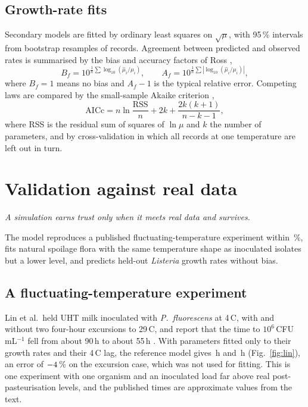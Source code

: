 \documentclass[11pt,a4paper,twoside,openany]{book}
\newcommand{\hook}[1]{{\noindent\fontsize{14}{20}\selectfont\itshape\color{dggrey}#1\par}\vspace{14pt}}
\newcommand{\degC}{\,\textdegree C}
\theoremstyle{plain}\newtheorem{proposition}{Proposition}\newtheorem{corollary}{Corollary}
\theoremstyle{definition}\newtheorem{definition}{Definition}[chapter]
\begin{document}
\section{Growth-rate fits}
Secondary models are fitted by ordinary least squares on $\sqrt{\mu}$, with 95\,\% intervals from bootstrap resamples of records. Agreement between predicted and observed rates is summarised by the bias and accuracy factors of Ross \cite{ross1996},
\begin{equation}\label{eq:bfaf}
B_f=10^{\frac1n\sum\log_{10}(\hat\mu_i/\mu_i)},\qquad A_f=10^{\frac1n\sum|\log_{10}(\hat\mu_i/\mu_i)|},
\end{equation}
where $B_f=1$ means no bias and $A_f-1$ is the typical relative error. Competing laws are compared by the small-sample Akaike criterion \cite{akaike1974,hurvich1989},
\begin{equation}\label{eq:aicc}
\mathrm{AICc}=n\ln\frac{\mathrm{RSS}}{n}+2k+\frac{2k(k+1)}{n-k-1},
\end{equation}
where RSS is the residual sum of squares of $\ln\mu$ and $k$ the number of parameters, and by cross-validation in which all records at one temperature are left out in turn.

\chapter{Validation against real data}\label{ch:val}
\hook{A simulation earns trust only when it meets real data and survives.}
\begin{summary}
The model reproduces a published fluctuating-temperature experiment within \NumLinErrAbs\,\%, fits natural spoilage flora with the same temperature shape as inoculated isolates but a lower level, and predicts held-out \textit{Listeria} growth rates without bias.
\end{summary}
\section{A fluctuating-temperature experiment}
Lin et al.\ held UHT milk inoculated with \textit{P.~fluorescens} at 4\degC, with and without two four-hour excursions to 29\degC, and report that the time to $10^6$\,CFU\,mL$^{-1}$ fell from about 90\,h to about 55\,h \cite{lin2016}. With parameters fitted only to their growth rates and their 4\degC{} lag, the reference model gives \NumLinConst\,h and \NumLinExc\,h (Fig.~\ref{fig:lin}), an error of $-4$\,\% on the excursion case, which was not used for fitting. This is one experiment with one organism and an inoculated load far above real post-pasteurisation levels, and the published times are approximate values from the text.
\end{document}
